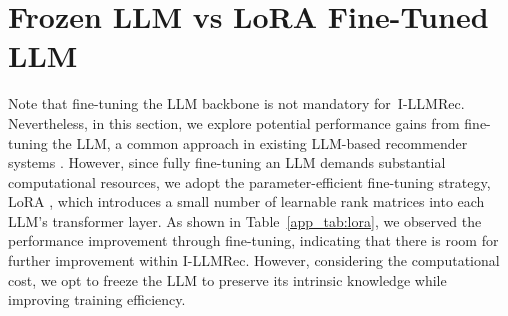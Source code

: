 \documentclass[sigconf]{acmart}
\newcommand{\proposed}{\textsf{I-LLMRec}}
\begin{document}
\begin{table}[h]
\caption{Performance comparison when LLM backbone of ~\proposed{} is fine-tuned using LoRA \cite{hu2021lora}.}
\vspace{-2.0ex}
\label{app_tab:lora}
\end{table}


\section{Frozen LLM vs LoRA Fine-Tuned LLM}
\label{app_sec:fine_tune}
Note that fine-tuning the LLM backbone is not mandatory for~\proposed{}. Nevertheless, in this section, we explore potential performance gains from fine-tuning the LLM, a common approach in existing LLM-based recommender systems \cite{lin2024bridging,bao2023tallrec,tan2024idgenrec,zheng2024harnessing,liu2024once}. However, since fully fine-tuning an LLM demands substantial computational resources, we adopt the parameter-efficient fine-tuning strategy, LoRA \cite{hu2021lora}, which introduces a small number of learnable rank matrices into each LLM's transformer layer. As shown in Table~\ref{app_tab:lora}, we observed the performance improvement through fine-tuning, indicating that there is room for further improvement within \proposed{}. However, considering the computational cost, we opt to freeze the LLM to preserve its intrinsic knowledge while improving training efficiency.
\end{document}
